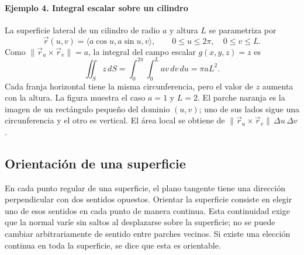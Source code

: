 \paragraph{Ejemplo 4. Integral escalar sobre un cilindro}
La superficie lateral de un cilindro de radio $a$ y altura $L$ se parametriza por
\[
\vec r(u,v)=\langle a\cos u,a\sin u,v\rangle,
\qquad0\leq u\leq2\pi,\quad0\leq v\leq L.
\]
Como $\lVert\vec r_u\times\vec r_v\rVert=a$, la integral del campo escalar $g(x,y,z)=z$ es
\[
\iint_S z\,dS
=\int_0^{2\pi}\int_0^L av\,dv\,du
=\pi aL^2.
\]
Cada franja horizontal tiene la misma circunferencia, pero el valor de $z$ aumenta con la altura.
La figura muestra el caso $a=1$ y $L=2$. El parche naranja es la imagen de un rectángulo pequeño del dominio $(u,v)$; uno de sus lados sigue una circunferencia y el otro es vertical. El área local se obtiene de $\lVert\vec r_u\times\vec r_v\rVert\,\Delta u\,\Delta v$.

\begingroup\shorthandoff{>}
\begin{center}
\end{center}
\endgroup

\subsection{Orientación de una superficie}

En cada punto regular de una superficie, el plano tangente tiene una dirección perpendicular con dos sentidos opuestos. Orientar la superficie consiste en elegir uno de esos sentidos en cada punto de manera continua. Esta continuidad exige que la normal varíe sin saltos al desplazarse sobre la superficie; no se puede cambiar arbitrariamente de sentido entre parches vecinos. Si existe una elección continua en toda la superficie, se dice que esta es orientable.

